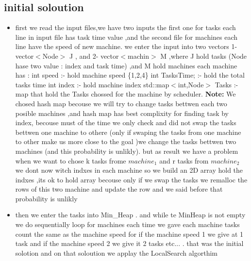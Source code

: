 \documentclass[a4paper,12pt]{report}
\begin{document}
\subsection{initial soloution}
\begin{itemize}
\item first we read the input files,we have two inputs the first one for tasks each line in input file has task time value ,and the second file for machines each line have the speed of new machine.\newline
we enter the input into two vectors 1- vector$<$Node$>$ J , and 2- vector$<$machin$>$ M ,where J hold tasks (Node hase two value : index and task time) ,and M hold machines \newline
each machine has :\newline 
int speed :-  hold machine speed \{1,2,4\}\newline
	int TasksTime; :- hold the total tasks time\newline
	int index :- hold machine index\newline
	std::map$<$int,Node$>$ Tasks :- map that hold the  Tasks chossed for the machine by scheduler.\newline
\textbf{Note:} We chosed hash map becouse we will try to change tasks bettwen each two posible machines ,and hash map has best  complixity for finding task by index, becouse must of the time we only check and did not 
swap the tasks bettwen one machine to othere (only if swaping the tasks from one machine to other make us more close to the goal )we change the tasks bettwen two machines (and this probability is unlikly).\newline
but as result we have a problem when we want to chose k tasks frome $machine_1$ and r tasks from $machine_2$ we dont now witch indxes in each machine so we build an 2D array hold the indxes ,its ok to hold array
becouse only if we swap the tasks we remalloc the rows of this two machine and update the row and we said before that  probability is unlikly\par
\item then we enter the tasks into Min\_Heap .\newline
and while te MinHeap is not empty we   do  sequentially loop for machines each time we gave each machine tasks count the same as the machine speed for if the machine speed 1 we give at 1 task and if the machine speed
2 we give it 2 tasks etc... .\newline
that was the initial solotion and on that soloution we applay the LocalSearch algorthim
\end{itemize}
\end{document}
